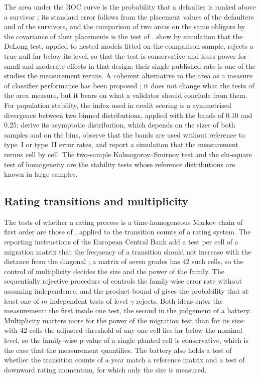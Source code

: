 The area under the ROC curve is the probability that a defaulter is ranked above a survivor \citep{hanley1982}; its standard error follows from the placement values of the defaulters and of the survivors, and the comparison of two areas on the same obligors by the covariance of their placements is the test of \citet{delong1988}.
\citet{demler2012} show by simulation that the DeLong test, applied to nested models fitted on the comparison sample, rejects a true null far below its level, so that the test is conservative and loses power for small and moderate effects in that design; their single published rate is one of the studies the measurement reruns.
A coherent alternative to the area as a measure of classifier performance has been proposed \citep{hand2009}; it does not change what the tests of the area measure, but it bears on what a validator should conclude from them.
For population stability, the index used in credit scoring is a symmetrised divergence between two binned distributions, applied with the bands of 0.10 and 0.25; \citet{yurdakul2020} derive its asymptotic distribution, which depends on the sizes of both samples and on the bins, observe that the bands are used without reference to type~I or type~II error rates, and report a simulation that the measurement reruns cell by cell.
The two-sample Kolmogorov--Smirnov test \citep{smirnov1948} and the chi-square test of homogeneity \citep{pearson1900} are the stability tests whose reference distributions are known in large samples.

\subsection{Rating transitions and multiplicity}
\label{sec:rw-transitions}

The tests of whether a rating process is a time-homogeneous Markov chain of first order are those of \citet{andersongoodman1957}, applied to the transition counts of a rating system.
The reporting instructions of the European Central Bank add a test per cell of a migration matrix that the frequency of a transition should not increase with the distance from the diagonal \citep{ecb2019instructions}; a matrix of seven grades has 42 such cells, so the control of multiplicity decides the size and the power of the family.
The sequentially rejective procedure of \citet{holm1979} controls the family-wise error rate without assuming independence, and the product bound of \citet{sidak1967} gives the probability that at least one of $m$ independent tests of level $\gamma$ rejects.
Both ideas enter the measurement: the first inside one test, the second in the judgement of a battery. Multiplicity matters more for the power of the migration test than for its size: with 42 cells the adjusted threshold of any one cell lies far below the nominal level, so the family-wise p-value of a single planted cell is conservative, which is the case that the measurement quantifies. The battery also holds a test of whether the transition counts of a year match a reference matrix and a test of downward rating momentum, for which only the size is measured.

